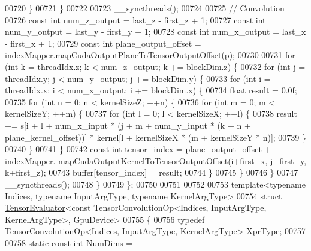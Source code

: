 \begin{DoxyCode}
00720       \}
00721     \}
00722 
00723     \_\_syncthreads();
00724 
00725     \textcolor{comment}{// Convolution}
00726     \textcolor{keyword}{const} \textcolor{keywordtype}{int} num\_z\_output = last\_z - first\_z + 1;
00727     \textcolor{keyword}{const} \textcolor{keywordtype}{int} num\_y\_output = last\_y - first\_y + 1;
00728     \textcolor{keyword}{const} \textcolor{keywordtype}{int} num\_x\_output = last\_x - first\_x + 1;
00729     \textcolor{keyword}{const} \textcolor{keywordtype}{int} plane\_output\_offset = indexMapper.mapCudaOutputPlaneToTensorOutputOffset(p);
00730 
00731     \textcolor{keywordflow}{for} (\textcolor{keywordtype}{int} k = threadIdx.z; k < num\_z\_output; k += blockDim.z) \{
00732       \textcolor{keywordflow}{for} (\textcolor{keywordtype}{int} j = threadIdx.y; j < num\_y\_output; j += blockDim.y) \{
00733         \textcolor{keywordflow}{for} (\textcolor{keywordtype}{int} i = threadIdx.x; i < num\_x\_output; i += blockDim.x) \{
00734           \textcolor{keywordtype}{float} result = 0.0f;
00735           \textcolor{keywordflow}{for} (\textcolor{keywordtype}{int} n = 0; n < kernelSizeZ; ++n) \{
00736             \textcolor{keywordflow}{for} (\textcolor{keywordtype}{int} m = 0; m < kernelSizeY; ++m) \{
00737               \textcolor{keywordflow}{for} (\textcolor{keywordtype}{int} l = 0; l < kernelSizeX; ++l) \{
00738                 result += s[i + l + num\_x\_input * (j + m + num\_y\_input * (k + n + plane\_kernel\_offset))] * 
      kernel[l + kernelSizeX * (m + kernelSizeY * n)];
00739               \}
00740             \}
00741           \}
00742           \textcolor{keyword}{const} \textcolor{keywordtype}{int} tensor\_index = plane\_output\_offset + indexMapper.
      mapCudaOutputKernelToTensorOutputOffset(i+first\_x, j+first\_y, k+first\_z);
00743           buffer[tensor\_index] = result;
00744         \}
00745       \}
00746     \}
00747     \_\_syncthreads();
00748   \}
00749 \};
00750 
00751 
00752 
00753 \textcolor{keyword}{template}<\textcolor{keyword}{typename} Indices, \textcolor{keyword}{typename} InputArgType, \textcolor{keyword}{typename} KernelArgType>
00754 \textcolor{keyword}{struct }\hyperlink{struct_eigen_1_1_tensor_evaluator}{TensorEvaluator}<const TensorConvolutionOp<Indices, InputArgType, KernelArgType>, 
      GpuDevice>
00755 \{
00756   \textcolor{keyword}{typedef} \hyperlink{class_eigen_1_1_tensor_convolution_op}{TensorConvolutionOp<Indices, InputArgType, KernelArgType>}
       \hyperlink{class_eigen_1_1_tensor_convolution_op}{XprType};
00757 
00758   \textcolor{keyword}{static} \textcolor{keyword}{const} \textcolor{keywordtype}{int} NumDims =  

\end{DoxyCode}
